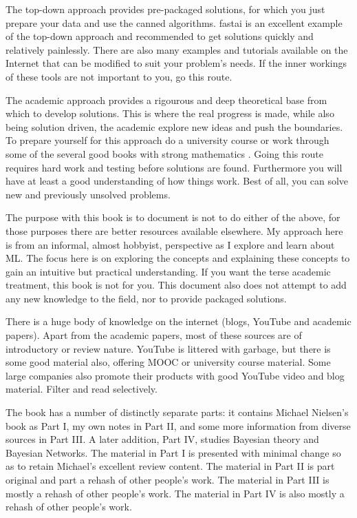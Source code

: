 The top-down approach provides pre-packaged solutions, for which you just prepare your data and use the canned algorithms. fastai \cite{fastai2019} is an excellent example of the top-down approach and recommended to get solutions quickly and relatively painlessly. There are also many examples and tutorials available on the Internet that can be modified to suit your problem's needs.  If the inner workings of these tools are not important to you, go this route. 

The academic approach provides a rigourous and deep theoretical base from which to develop solutions.  This is where the real progress is made, while also being solution driven, the academic explore new ideas and push the boundaries. To prepare yourself for this approach do a university course or work through some of the several good books with strong mathematics  \cite{geron2017handson,Webb2002statpatn,Michie94,theodoridis2003,Duda2001,Bishop1995,Bishop2006,Goodfellow2016}. 
Going this route requires hard work and testing before solutions are found. Furthermore you will have at least a good understanding of how things work. Best of all, you can solve new and previously unsolved problems.

The purpose with this book is to document is not to do either of the above, for those purposes there are better resources available elsewhere.  My approach here is from an informal, almost hobbyist, perspective as I explore and learn about \ac{ML}. The focus here is on exploring the concepts and explaining these concepts to gain an intuitive but practical understanding.  If you want the terse academic treatment, this book is not for you. This document also does not attempt to add any new knowledge to the field, nor to provide packaged solutions.

There is a huge body of knowledge on the internet (blogs, YouTube and academic papers). Apart from the academic papers, most of these sources are of introductory or review nature. YouTube is littered with garbage,  but there is some good material also, offering \ac{MOOC} or university course material. Some large companies also promote their products with good YouTube video and blog material. Filter and read selectively.

The book has a number of distinctly separate parts: it contains Michael Nielsen's book as Part I, my own notes in Part II, and some more information from diverse sources in Part III.  A later addition, Part IV, studies Bayesian theory and Bayesian Networks.
 The material in Part I is presented with minimal change so as to retain Michael's excellent review content.  The material in Part II is part original and part a rehash of other people's work. 
 The material in Part III is mostly a rehash of other people's work.
 The material in Part IV is also mostly a rehash of other people's work.

